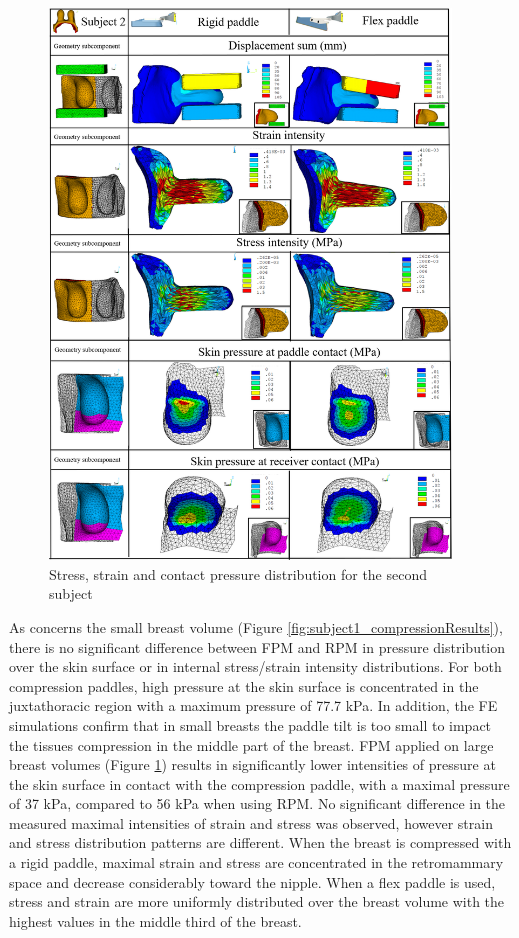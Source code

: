 \begin{figure}[h]
\centering
\includegraphics[width=0.95\textwidth,keepaspectratio]{figures/subject2_compressionResults.png} 
\caption{Stress, strain and contact pressure distribution for the second subject}\label{fig:subject2_compressionResults}
\end{figure}


As concerns the small breast volume (Figure \ref{fig:subject1_compressionResults}), there is no significant difference between FPM and RPM in pressure distribution over the skin surface or in internal stress/strain intensity distributions. For both compression paddles, high pressure at the skin surface is concentrated in the juxtathoracic region with a maximum pressure of 77.7 kPa. In addition, the FE simulations confirm that in small breasts the paddle tilt is too small to impact the tissues compression in the middle part of the breast. 
FPM applied on large breast volumes (Figure \ref{fig:subject2_compressionResults}) results in significantly lower intensities of pressure at the skin surface in contact with the compression paddle, with a maximal pressure of 37 kPa, compared to 56 kPa when using RPM. No significant difference in the measured maximal intensities of strain and stress was observed, however strain and stress distribution patterns are different. When the breast is compressed with a rigid paddle, maximal strain and stress are concentrated in the retromammary space and decrease considerably toward the nipple. When a flex paddle is used, stress and strain are more uniformly distributed over the breast volume with the highest values in the middle third of the breast.


